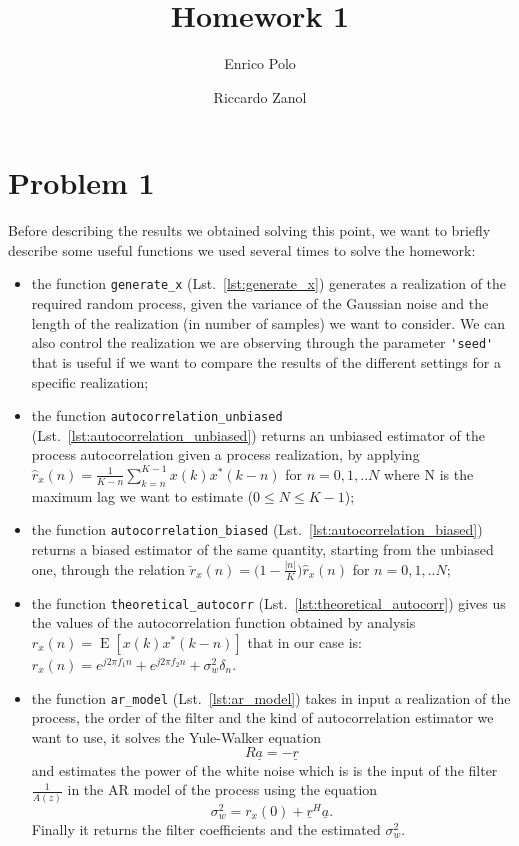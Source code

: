 \documentclass{article}
\author{Enrico Polo \and Riccardo Zanol}
\title{Homework 1}
\newcommand{\inlinecode}[1]{\lstinline[basicstyle=\ttfamily,
    keywordstyle={}]{#1}}
\renewcommand{\vec}[1]{\underline{#1}}
\newcommand{\E}[1]{\operatorname{E}\left[#1\right]}
\begin{document}
\maketitle
\section*{Problem 1}
Before describing the results we obtained solving this point, we want to briefly describe some useful functions we used several times to solve the homework:
\begin{itemize}
 \item the function \inlinecode{generate_x} (Lst.~\ref{lst:generate_x}) generates a realization of the required random process, given the variance of the Gaussian noise and the length of the realization (in number of samples) we want to consider. We can also control the realization we are observing through the parameter \inlinecode{'seed'} that is useful if we want to compare the results of the different settings for a specific realization; 
 \item the function \inlinecode{autocorrelation_unbiased} (Lst.~\ref{lst:autocorrelation_unbiased}) returns an unbiased estimator of the process autocorrelation given a process realization, by applying $\hat{r}_x(n) = \frac{1}{K-n} \sum_{k=n}^{K-1} {x(k)x^*(k-n)}$ for $n = 0,1,..N$ where N is the maximum lag we want to estimate ($0\leq N \leq K-1$);
 \item the function \inlinecode{autocorrelation_biased} (Lst.~\ref{lst:autocorrelation_biased}) returns a biased estimator of the same quantity, starting from the unbiased one, through the relation $\breve{r}_x(n) = \bigl( 1 - \frac{|n|}{K}\bigr) \hat{r}_x(n)$ for $n = 0,1,..N$;
 \item  the function \inlinecode{theoretical_autocorr} (Lst.~\ref{lst:theoretical_autocorr}) gives us the values of the autocorrelation function obtained by analysis $r_x (n) =  \E{x(k)x^*(k-n)}$ that in our case is: $r_x (n) = e^{j2 \pi f_1n} + e^{j2\pi f_2n} + \sigma_w^2 \delta_n$.
 \item the function \inlinecode{ar_model} (Lst.~\ref{lst:ar_model})
   takes in input a realization of the process, the order of the
   filter and the kind of autocorrelation estimator we want to use, it
   solves the Yule-Walker equation
   \[ R\vec{a} = -\vec{r} \]
   and estimates the power of the white noise which is is the input of
   the filter $\frac{1}{A(z)}$ in the AR model of the process using the equation
   \[ \sigma^2_w = r_x(0) + \vec{r}^H\vec{a} . \]
   Finally it returns the filter coefficients and the estimated $\sigma^2_w$.
\end{itemize}
\end{document}
